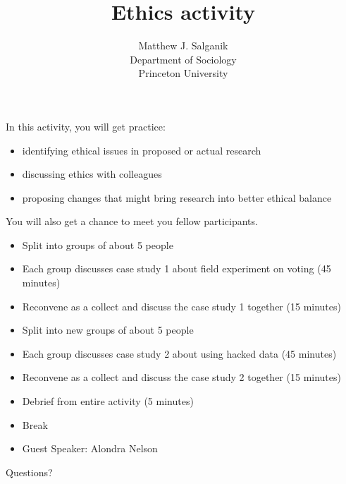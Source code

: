 \documentclass{beamer}
\title[]{Ethics activity}
\author[]{Matthew J. Salganik\\Department of Sociology\\Princeton University}
\date[]{Summer Institute in Computational Social Science\\June 18, 2018
\vfill
\begin{flushleft}
{\scriptsize
The Summer Institute in Computational Social Science is supported by grants from the Russell Sage Foundation and the Alfred P. Sloan Foundation.}
\end{flushleft}
\begin{flushright}
\vspace{0.1in}
\texttt{[image: figures/cc-by.png]}
\end{flushright}
}
\begin{document}
\frame{\titlepage}
\begin{frame}

In this activity, you will get practice:
\begin{itemize}
\item identifying ethical issues in proposed or actual research
\pause
\item discussing ethics with colleagues
\pause
\item proposing changes that might bring research into better ethical balance
\end{itemize}
\pause
\vfill
You will also get a chance to meet you fellow participants.

\end{frame}
\begin{frame}

\begin{itemize}
\item Split into groups of about 5 people
\pause
\item Each group discusses case study 1 about field experiment on voting (45 minutes)
\pause
\item Reconvene as a collect and discuss the case study 1 together (15 minutes)
\pause
\item Split into new groups of about 5 people
\pause
\item Each group discusses case study 2 about using hacked data (45 minutes)
\pause
\item Reconvene as a collect and discuss the case study 2 together (15 minutes)
\pause
\item Debrief from entire activity (5 minutes)
\pause
\item Break
\pause
\item Guest Speaker: Alondra Nelson
\end{itemize}

\end{frame}
\begin{frame}

\begin{center}
\LARGE
Questions?
\end{center}

\end{frame}
\end{document}
